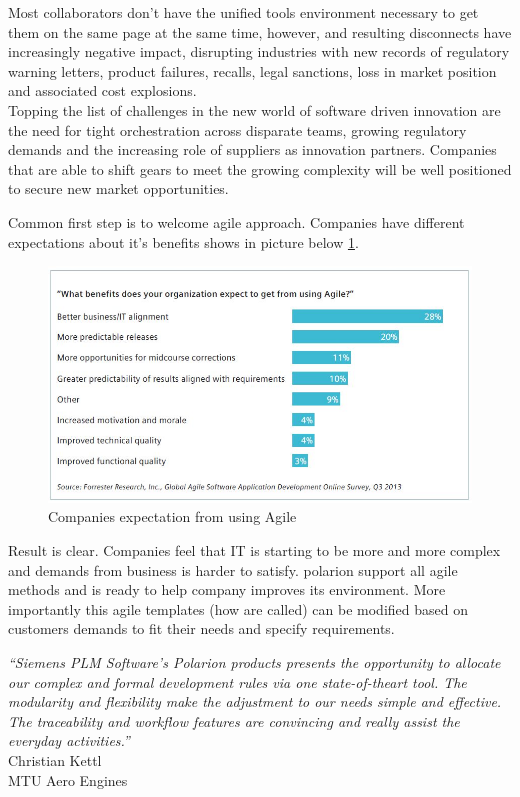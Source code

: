 \documentclass[thesis=M,english]{FITthesis}[2012/06/26]
\begin{document}
Most collaborators don’t have the unified tools environment necessary to get them on the same page at the same time, however, and resulting disconnects have increasingly negative impact, disrupting industries with new records of regulatory warning letters, product failures, recalls, legal sanctions, loss in market position and associated cost explosions.\\

Topping the list of challenges in the new world of software driven innovation are the need for tight orchestration across disparate teams, growing regulatory demands and the increasing role of suppliers as innovation partners. Companies that are able to shift gears to meet the growing complexity will be well positioned to secure new market opportunities.

Common first step is to welcome agile approach. Companies have different expectations about it's benefits shows in picture below \ref{fig:agile_benefits}.

\begin{figure}[h!]\centering
	\includegraphics[width=1\textwidth]{pictures/agile_benefits}
	\caption{Companies expectation from using Agile\cite{polarion_alm}}\label{fig:agile_benefits}
\end{figure}

Result is clear. Companies feel that IT is starting to be more and more complex and demands from business is harder to satisfy. \acrshort{polarion} support all agile methods and is ready to help company improves its environment. More importantly this agile templates (how are called) can be modified based on customers demands to fit their needs and specify requirements.

\begin{center}
	\textit{“Siemens PLM Software’s Polarion
		products presents the opportunity to
		allocate our complex and formal
		development rules via one state-of-theart
		tool. The modularity and flexibility
		make the adjustment to our needs simple
		and effective. The traceability and
		workflow features are convincing and
		really assist the everyday activities.”}\\
Christian Kettl\\
MTU Aero Engines\\
\end{center}
\end{document}
